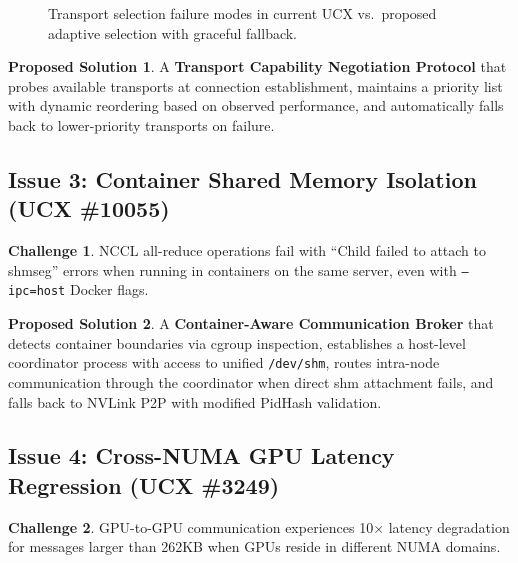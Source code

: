 \documentclass[11pt,letterpaper]{article}
\theoremstyle{definition}
\newtheorem{challenge}{Challenge}
\newtheorem{solution}{Proposed Solution}
\begin{document}
\begin{figure}[htbp]
{%
}
\caption{Transport selection failure modes in current UCX vs.\ proposed adaptive selection with graceful fallback.}
\label{fig:transport-selection}
\end{figure}

\begin{solution}
A \textbf{Transport Capability Negotiation Protocol} that probes available transports at connection establishment, maintains a priority list with dynamic reordering based on observed performance, and automatically falls back to lower-priority transports on failure.
\end{solution}

\subsection{Issue 3: Container Shared Memory Isolation (UCX \#10055)}

\begin{challenge}
NCCL all-reduce operations fail with ``Child failed to attach to shmseg'' errors when running in containers on the same server, even with \texttt{--ipc=host} Docker flags.
\end{challenge}

\begin{solution}
A \textbf{Container-Aware Communication Broker} that detects container boundaries via cgroup inspection, establishes a host-level coordinator process with access to unified \texttt{/dev/shm}, routes intra-node communication through the coordinator when direct shm attachment fails, and falls back to NVLink P2P with modified PidHash validation.
\end{solution}

\subsection{Issue 4: Cross-NUMA GPU Latency Regression (UCX \#3249)}

\begin{challenge}
GPU-to-GPU communication experiences 10$\times$ latency degradation for messages larger than 262KB when GPUs reside in different NUMA domains.
\end{challenge}
\end{document}
